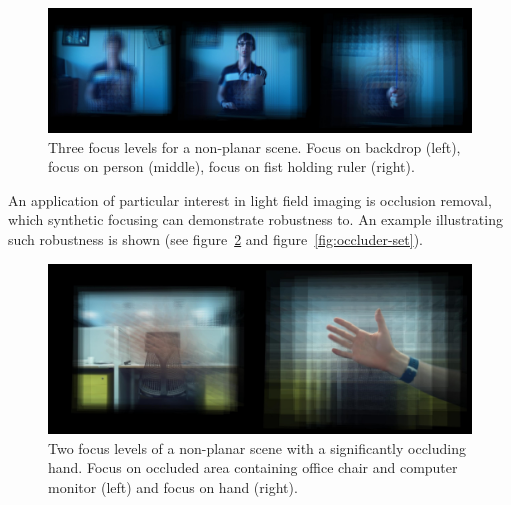 \documentclass[../main.tex]{subfiles}
\begin{document}
\begin{figure}[H]
    \centering
    \includegraphics[width=\linewidth]{images/focus-levels}
    \caption{Three focus levels for a non-planar scene. Focus on backdrop (left), focus on person (middle), focus on fist holding ruler (right).}
    \label{fig:focus-levels}
\end{figure}

An application of particular interest in light field imaging is occlusion removal, which synthetic focusing can demonstrate robustness to. An example illustrating such robustness is shown (see figure~\ref{fig:robustness-to-occlusion} and figure~\ref{fig:occluder-set}).

\begin{figure}[H]
    \centering
    \includegraphics[width=\linewidth]{images/robustness-to-occlusion}
    \caption{Two focus levels of a non-planar scene with a significantly occluding hand. Focus on occluded area containing office chair and computer monitor (left) and focus on hand (right).}
    \label{fig:robustness-to-occlusion}
\end{figure}
\end{document}
